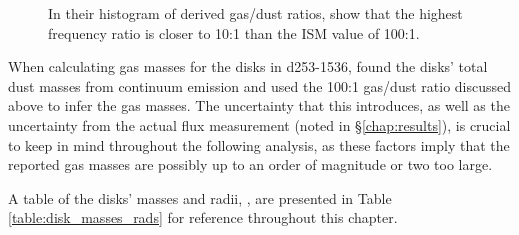 \begin{figure}[ht]
  \centering
  \hspace*{\fill}%
  \vfill%
  \hspace*{\fill}%
  \caption{In their histogram of derived gas/dust ratios, \citet{Miotello2017} show that the highest frequency ratio is closer to 10:1 than the ISM value of 100:1.}
  \label{fig:GDRs}
\end{figure}


When calculating gas masses for the disks in d253-1536, \cite{Williams2014} found the disks' total dust masses from continuum emission and used the 100:1 gas/dust ratio discussed above to infer the gas masses. The uncertainty that this introduces, as well as the uncertainty from the actual flux measurement (noted in \S\ref{chap:results}), is crucial to keep in mind throughout the following analysis, as these factors imply that the reported gas masses are possibly up to an order of magnitude or two too large.

A table of the disks' masses and radii,  \citep[as well as those from][for comparison]{Factor2017}, are presented in Table \ref{table:disk_masses_rads} for reference throughout this chapter.


